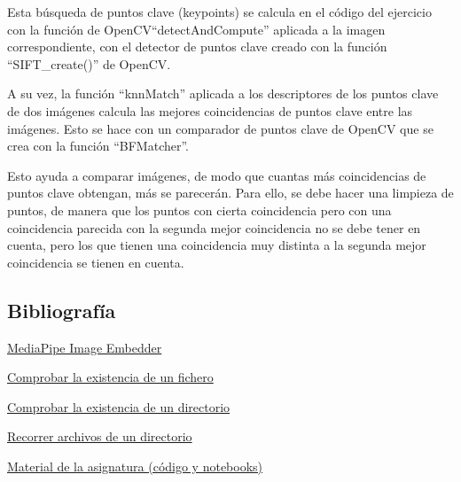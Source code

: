 \documentclass[12pt]{article}
\begin{document}
Esta búsqueda de puntos clave (keypoints) se calcula en el código del ejercicio con la función de OpenCV``detectAndCompute'' aplicada a la imagen correspondiente, con el detector de puntos clave creado con la función ``SIFT\_create()'' de OpenCV.

A su vez, la función ``knnMatch'' aplicada a los descriptores de los puntos clave de dos imágenes calcula las mejores coincidencias de puntos clave entre las imágenes. Esto se hace con un comparador de puntos clave de OpenCV que se crea con la función ``BFMatcher''.

Esto ayuda a comparar imágenes, de modo que cuantas más coincidencias de puntos clave obtengan, más se parecerán. Para ello, se debe hacer una limpieza de puntos, de manera que los puntos con cierta coincidencia pero con una coincidencia parecida con la segunda mejor coincidencia no se debe tener en cuenta, pero los que tienen una coincidencia muy distinta a la segunda mejor coincidencia se tienen en cuenta.

\subsection*{Bibliografía}
\href{https://developers.google.com/mediapipe/solutions/vision/image_embedder/python}{MediaPipe Image Embedder}

\href{https://www.geeksforgeeks.org/python-os-path-exists-method/}{Comprobar la existencia de un fichero}

\href{https://www.geeksforgeeks.org/python-os-path-isdir-method/}{Comprobar la existencia de un directorio}

\href{https://www.codigopiton.com/como-listar-archivos-de-carpeta-en-python/}{Recorrer archivos de un directorio}

\href{https://github.com/albertoruiz/umucv/blob/master}{Material de la asignatura (código y notebooks)}
\end{document}
